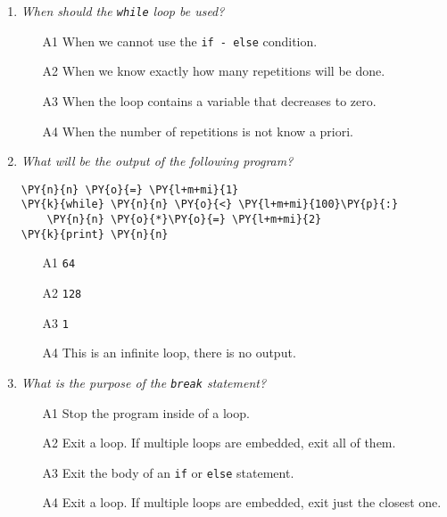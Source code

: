 \begin{enumerate}
\vspace{6mm}

\item {\em When should the {\tt while} loop be used?}\\

\begin{enumerate}
\item[A1] When we cannot use the {\tt if - else} condition.
\item[A2] When we know exactly how many repetitions will be done.
\item[A3] When the loop contains a variable that decreases to zero.
\item[A4] When the number of repetitions is not know a priori.
\end{enumerate}

\vspace{6mm}

\item {\em What will be the output of the following program?}\\

\begin{Verbatim}[commandchars=\\\{\}]
\PY{n}{n} \PY{o}{=} \PY{l+m+mi}{1}
\PY{k}{while} \PY{n}{n} \PY{o}{<} \PY{l+m+mi}{100}\PY{p}{:}
    \PY{n}{n} \PY{o}{*}\PY{o}{=} \PY{l+m+mi}{2}
\PY{k}{print} \PY{n}{n}
\end{Verbatim}
\vspace{6mm}

\begin{enumerate}
\item[A1] {\tt 64}
\item[A2] {\tt 128}
\item[A3] {\tt 1}
\item[A4] This is an infinite loop, there is no output.
\end{enumerate}

\vspace{6mm}

\item {\em What is the purpose of the {\tt break} statement?}\\

\begin{enumerate}
\item[A1] Stop the program inside of a loop.
\item[A2] Exit a loop. If multiple loops are embedded, exit all of them.
\item[A3] Exit the body of an {\tt if} or {\tt else} statement.
\item[A4] Exit a loop. If multiple loops are embedded, exit just the closest one.
\end{enumerate}


\end{enumerate}
